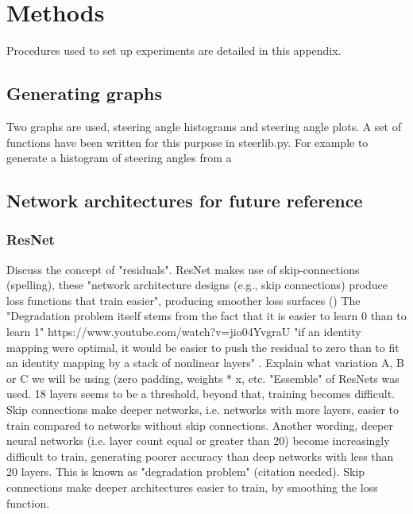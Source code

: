 \label{AppendixA-methods} %
\chapter{Methods} %

Procedures used to set up experiments are detailed in this appendix.

\section{Generating graphs}

Two graphs are used, steering angle histograms and steering angle plots. A set of functions have been written for this purpose in steerlib.py. For example to generate a histogram of steering angles from a 

\section{Network architectures for future reference}

\subsection{ResNet}

Discuss the concept of "residuals". ResNet makes use of skip-connections (spelling), these "network architecture
designs (e.g., skip connections) produce loss functions that train easier", producing smoother loss surfaces (\cite{li2017visualizing})  
The "Degradation problem itself stems from the fact that it is easier to learn 0 than to learn 1"   https://www.youtube.com/watch?v=jio04YvgraU
"if an identity mapping were optimal, it would be easier to push the residual to zero than to fit an identity mapping by a stack of nonlinear layers" \cite{he2015deep}.  
Explain what variation A, B or C we will be using (zero padding, weights * x, etc.  
"Essemble" of ResNets was used.  
18 layers seems to be a threshold, beyond that, training becomes difficult. Skip connections make deeper networks, i.e. networks with more layers, easier to train compared to networks without skip connections.  
Another wording, deeper neural networks (i.e. layer count equal or greater than 20) become increasingly difficult to train, generating poorer accuracy than deep networks with less than 20 layers. This is known as "degradation problem" (citation needed). Skip connections make deeper architectures easier to train, by smoothing the loss function.

